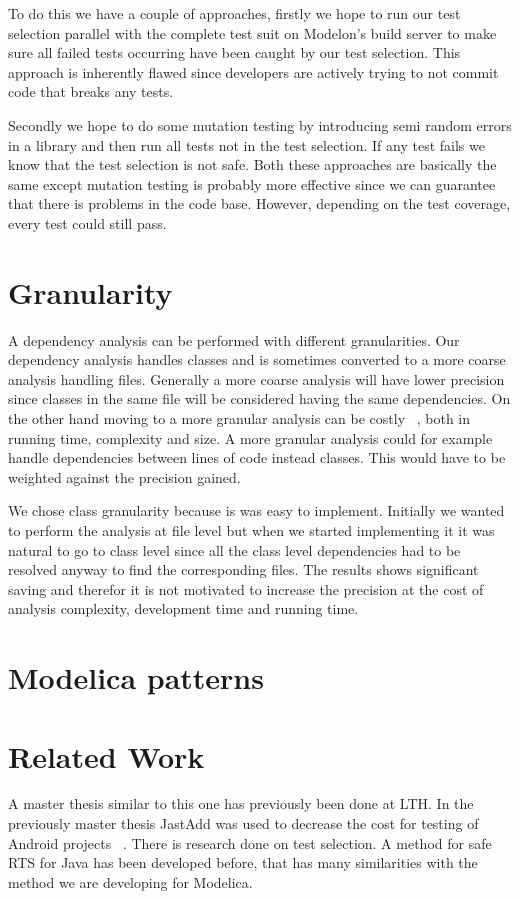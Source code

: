 \documentclass{cslthse-msc}
\begin{document}
To do this we have a couple of approaches, firstly we hope to run our test selection parallel with the complete test suit on Modelon's build server to make sure all failed tests occurring have been caught by our test selection. This approach is inherently flawed since developers are actively trying to not commit code that breaks any tests. %


Secondly we hope to do some mutation testing by introducing semi random errors in a library and then run all tests not in the test selection. If any test fails we know that the test selection is not safe. Both these approaches are basically the same except mutation testing is probably more effective since we can guarantee that there is problems in the code base. However, depending on the test coverage, every test could still pass.


\section{Granularity}
A dependency analysis can be performed with different granularities. Our dependency analysis handles classes and is sometimes converted to a more coarse analysis handling files. Generally a more coarse analysis will have lower precision since classes in the same file will be considered having the same dependencies. On the other hand moving to a more granular analysis can be costly ~\cite{DBLP:conf/sigsoft/LegunsenHSLZM16}, both in running time, complexity and size. A more granular analysis could for example handle dependencies between lines of code instead classes. This would have to be weighted against the precision gained.

We chose class granularity because is was easy to implement. Initially we wanted to perform the analysis at file level but when we started implementing it it was natural to go to class level since all the class level dependencies had to be resolved anyway to find the corresponding files. The results shows significant saving and therefor it is not motivated to increase the precision at the cost of analysis complexity, development time and running time.

\section{Modelica patterns}


\section{Related Work}
A master thesis similar to this one has previously been done at LTH. In the previously master thesis JastAdd was used to decrease the cost for testing of Android projects ~\cite{kampe2012dependroid}. There is research done on test selection. A method for safe RTS for Java has been developed before, that has many similarities with the method we are developing for Modelica. 
\end{document}
